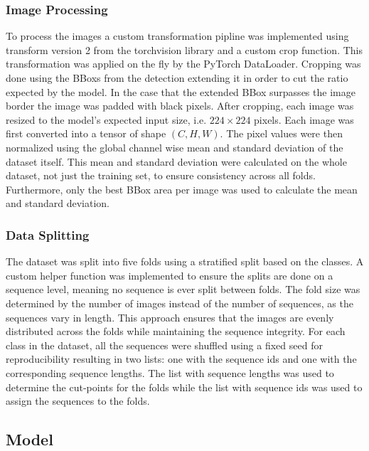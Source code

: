         \subsubsection{Image Processing}
        To process the images a custom transformation pipline was implemented using transform version 2 from the torchvision library and a custom crop function.
        This transformation was applied on the fly by the PyTorch DataLoader.
        Cropping was done using the \acp{BBox} from the detection extending it in order to cut the ratio expected by the model.
        In the case that the extended \ac{BBox} surpasses the image border the image was padded with black pixels.
        After cropping, each image was resized to the model's expected input size, i.e. \(224\times224\) pixels.
        Each image was first converted into a tensor of shape \((C,H,W)\). 
        The pixel values were then normalized using the global channel wise mean and standard deviation of the dataset itself.
        This mean and standard deviation were calculated on the whole dataset, not just the training set, to ensure consistency across all folds.
        Furthermore, only the best \ac{BBox} area per image was used to calculate the mean and standard deviation.

        \subsubsection{Data Splitting}
        The dataset was split into five folds using a stratified split based on the classes.
        A custom helper function was implemented to ensure the splits are done on a sequence level, meaning no sequence is ever split between folds.
        The fold size was determined by the number of images instead of the number of sequences, as the sequences vary in length.
        This approach ensures that the images are evenly distributed across the folds while maintaining the sequence integrity.
        For each class in the dataset, all the sequences were shuffled using a fixed seed for reproducibility resulting in two lists: one with the sequence ids and one with the corresponding sequence lengths.
        The list with sequence lengths was used to determine the cut-points for the folds while the list with sequence ids was used to assign the sequences to the folds.


    \subsection{Model}

